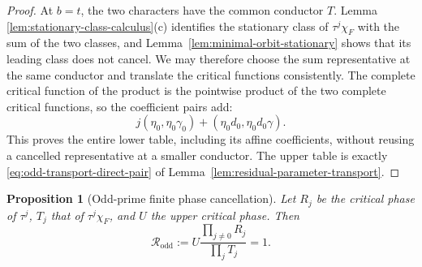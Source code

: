 \documentclass[11pt]{amsart}
\newtheorem{proposition}[theorem]{Proposition}
\theoremstyle{definition}
\theoremstyle{remark}
\begin{document}
\begin{proof}
At $b=t$, the two characters have the common conductor $T$.  Lemma
\ref{lem:stationary-class-calculus}(c) identifies the stationary class
of $\tau^j\chi_F$ with the sum of the two classes, and
Lemma~\ref{lem:minimal-orbit-stationary} shows that its leading class
does not cancel.  We may therefore choose the sum representative at the
same conductor and translate the critical functions consistently.  The
complete critical function of the product is the pointwise product of
the two complete critical functions, so the coefficient pairs add:
\[
 j(\eta_0,\eta_0\gamma_0)
 +(\eta_0d_0,\eta_0d_0\gamma).
\]
This proves the entire lower table, including its affine coefficients,
without reusing a cancelled representative at a smaller conductor.
The upper table is exactly \eqref{eq:odd-transport-direct-pair} of
Lemma~\ref{lem:residual-parameter-transport}.
\end{proof}


\begin{proposition}[Odd-prime finite phase cancellation]
\label{prop:odd-phase-cancel}
Let $R_j$ be the critical phase of $\tau^j$, $T_j$ that of
$\tau^j\chi_F$, and $U$ the upper critical phase.  Then
\begin{equation}\label{eq:Rodd}
 \mathcal R_{\mathrm{odd}}
 :=U\frac{\prod_{j\ne0}R_j}{\prod_jT_j}=1.
\end{equation}
\end{proposition}
\end{document}
